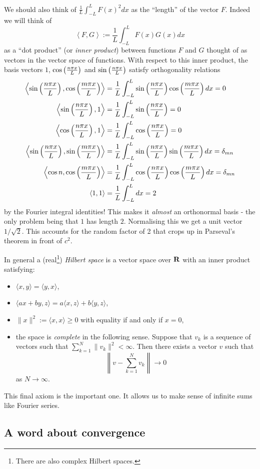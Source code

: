 We should also think of $\frac{1}{L}\int_{-L}^LF(x)^2dx$ as the ``length'' of the vector $F$. Indeed we will think of
\[\left\langle F,G\right\rangle:=\frac{1}{L}\int_{-L}^LF(x)G(x)dx\]
as a ``dot product'' (or {\em inner product}) between functions $F$ and $G$ thought of as vectors in the vector space of functions. With respect to this inner product, the basis vectors $1$, $\cos\left(\frac{n \pi x}{L}\right)$ and $\sin\left(\frac{n \pi x}{L}\right)$ satisfy orthogonality relations
\begin{align*}
\left\langle \sin\left(\frac{n \pi x}{L}\right),\cos\left(\frac{m \pi x}{L}\right)\right\rangle&=\frac{1}{L}\int_{-L}^L\sin\left(\frac{n \pi x}{L}\right)\cos\left(\frac{m \pi x}{L}\right)dx=0\\
\left\langle \sin\left(\frac{n \pi x}{L}\right),1\right\rangle&=\frac{1}{L}\int_{-L}^L\sin\left(\frac{n \pi x}{L}\right)=0\\
\left\langle \cos\left(\frac{n \pi x}{L}\right),1\right\rangle&=\frac{1}{L}\int_{-L}^L\cos\left(\frac{n \pi x}{L}\right)=0\\
\left\langle \sin\left(\frac{n \pi x}{L}\right),\sin\left(\frac{m \pi x}{L}\right)\right\rangle&=\frac{1}{L}\int_{-L}^L\sin\left(\frac{n \pi x}{L}\right)\sin\left(\frac{m \pi x}{L}\right)dx=\delta_{mn}\\
\left\langle \cos{n},\cos\left(\frac{m \pi x}{L}\right)\right\rangle&=\frac{1}{L}\int_{-L}^L\cos\left(\frac{n \pi x}{L}\right)\cos\left(\frac{m \pi x}{L}\right)dx=\delta_{mn}\\
\left\langle 1,1\right\rangle&=\frac{1}{L}\int_{-L}^Ldx=2
\end{align*}
by the Fourier integral identities! This makes it {\em almost} an orthonormal basis - the only problem being that $1$ has length $2$. Normalising this we get a unit vector $1/\sqrt{2}$. This accounts for the random factor of 2 that crops up in Parseval's theorem in front of $c^2$.

In general a (real\footnote{There are also complex Hilbert spaces.}) {\em Hilbert space} is a vector space over $\mathbf{R}$ with an inner product satisfying:
\begin{itemize}
\item $\langle x,y\rangle=\langle y,x\rangle$,
\item $\langle ax+by,z\rangle=a\langle x,z\rangle+b\langle y,z\rangle$,
\item $\|x\|^2:=\langle x,x\rangle\geq 0$ with equality if and only if $x=0$,
\item the space is {\em complete} in the following sense. Suppose that $v_k$ is a sequence of vectors such that $\sum_{k=1}^N\|v_k\|^2<\infty$. Then there exists a vector $v$ such that
\[\left\|v-\sum_{k=1}^{N}v_k\right\|\to 0\]
as $N\to\infty$.
\end{itemize}
This final axiom is the important one. It allows us to make sense of infinite sums like Fourier series.

\subsection{A word about convergence}

